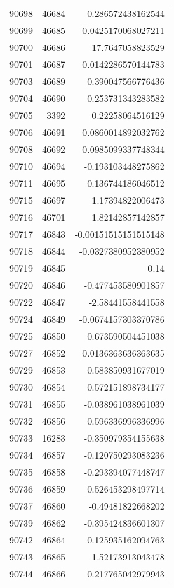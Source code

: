 \begin{tabular}{r | r | r}
90698 & 46684 & 0.286572438162544 \\
90699 & 46685 & -0.0425170068027211 \\
90700 & 46686 & 17.7647058823529 \\
90701 & 46687 & -0.0142286570144783 \\
90703 & 46689 & 0.390047566776436 \\
90704 & 46690 & 0.253731343283582 \\
90705 & 3392 & -0.22258064516129 \\
90706 & 46691 & -0.0860014892032762 \\
90708 & 46692 & 0.0985099337748344 \\
90710 & 46694 & -0.193103448275862 \\
90711 & 46695 & 0.136744186046512 \\
90715 & 46697 & 1.17394822006473 \\
90716 & 46701 & 1.82142857142857 \\
90717 & 46843 & -0.00151515151515148 \\
90718 & 46844 & -0.0327380952380952 \\
90719 & 46845 & 0.14 \\
90720 & 46846 & -0.477453580901857 \\
90722 & 46847 & -2.58441558441558 \\
90724 & 46849 & -0.0674157303370786 \\
90725 & 46850 & 0.673590504451038 \\
90727 & 46852 & 0.0136363636363635 \\
90729 & 46853 & 0.583850931677019 \\
90730 & 46854 & 0.572151898734177 \\
90731 & 46855 & -0.038961038961039 \\
90732 & 46856 & 0.596336996336996 \\
90733 & 16283 & -0.350979354155638 \\
90734 & 46857 & -0.120750293083236 \\
90735 & 46858 & -0.293394077448747 \\
90736 & 46859 & 0.526453298497714 \\
90737 & 46860 & -0.49481822668202 \\
90739 & 46862 & -0.395424836601307 \\
90742 & 46864 & 0.125935162094763 \\
90743 & 46865 & 1.52173913043478 \\
90744 & 46866 & 0.217765042979943 \\

\end{tabular}
